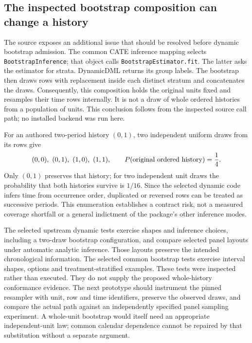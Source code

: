 \subsection{The inspected bootstrap composition can change a history}
\label{exec19:econml-bootstrap}

The source exposes an additional issue that should be resolved before dynamic
bootstrap admission. The common CATE inference mapping selects
\texttt{BootstrapInference}; that object calls \texttt{BootstrapEstimator.fit}.
The latter asks the estimator for strata. DynamicDML returns its group labels.
The bootstrap then draws rows with replacement inside each distinct stratum
and concatenates the draws. Consequently, this composition holds the original
units fixed and resamples their time rows internally. It is not a draw of
whole ordered histories from a population of units. This conclusion follows
from the inspected source call path; no installed backend was run here.
\citep{exec19_econml_source}

For an authored two-period history $(0,1)$, two independent uniform draws from
its rows give
\begin{equation}
 (0,0),\ (0,1),\ (1,0),\ (1,1),
 \qquad P(\hbox{original ordered history})=\frac14.
 \label{exec19:econml-resampling}
\end{equation}
Only $(0,1)$ preserves that history; for two independent unit draws the
probability that both histories survive is $1/16$. Since the selected dynamic
code infers time from occurrence order, duplicated or reversed rows can be
treated as successive periods. This enumeration establishes a contract risk,
not a measured coverage shortfall or a general indictment of the package's
other inference modes.\citep{exec19_econml_reference}

The selected upstream dynamic tests exercise shapes and inference choices,
including a two-draw bootstrap configuration, and compare selected panel
layouts under automatic analytic inference. Those layouts preserve the
intended chronological information. The selected common bootstrap tests
exercise interval shapes, options and treatment-stratified examples. These
tests were inspected rather than executed. They do not supply the proposed
whole-history conformance evidence. The next prototype should instrument the
pinned resampler with unit, row and time identifiers, preserve the observed
draws, and compare the actual path against an independently specified panel
sampling experiment. A whole-unit bootstrap would itself need an appropriate
independent-unit law; common calendar dependence cannot be repaired by that
substitution without a separate argument.\citep{exec19_econml_source}

